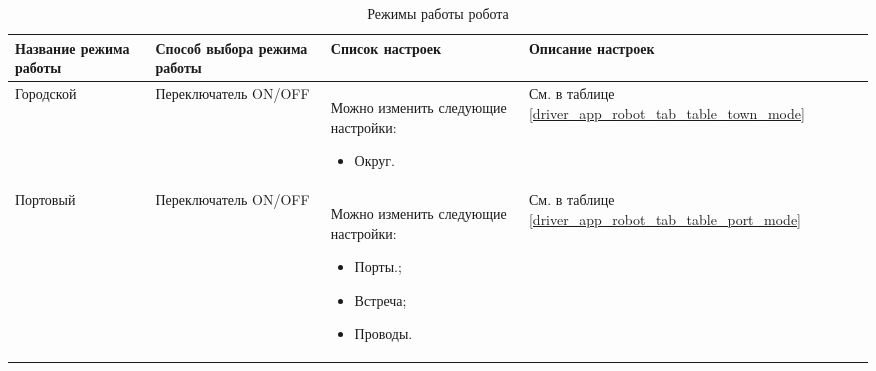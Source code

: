       \begin{table}
          \begin{center}
          \label{driver_app_robot_tab_modes}
          \caption {Режимы работы робота}
          \setlength{\extrarowheight}{2mm}
          \begin{tabular}{|p{3cm}|p{3cm}|p{6cm}|p{3cm}|}

            \hline     \textbf{Название режима работы}&\textbf{Способ выбора режима работы}&\textbf{Список настроек}&\textbf{Описание настроек} \\ [2mm]

            \hline   Городской & Переключатель ON/OFF & Можно изменить следующие настройки: \begin{itemize} \item Округ. \end{itemize} & См. в таблице \ref{driver_app_robot_tab_table_town_mode} \\ [2mm]

            \hline   Портовый & Переключатель ON/OFF & Можно изменить следующие настройки: \begin{itemize} \item Порты.;  \item Встреча;  \item Проводы. \end{itemize} & См. в таблице \ref{driver_app_robot_tab_table_port_mode}  \\ [2mm]

            \hline
          \end{tabular}
          \end{center}
      \end{table}

